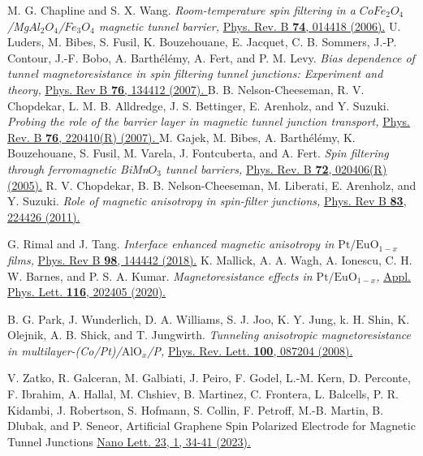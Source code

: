 \documentclass[10pt,pr,twocolumn,showpacs,amssymb,floatfix,superscriptaddress]{revtex4-1}
\begin{document}
\begin{thebibliography}{999}
 M. G. Chapline and S. X. Wang. 
\textit{Room-temperature spin filtering in a $Co$$Fe_2$$O_4$/Mg${Al}_{2}$$O_4$/$Fe_3$$O_4$ magnetic tunnel barrier,}
\href{https://doi.org/10.1103/PhysRevB.74.014418}{Phys. Rev. B {\bf 74}, 014418 (2006).}
U. Luders, M. Bibes, S. Fusil, K. Bouzehouane, E. Jacquet, C. B. Sommers, J.-P. Contour, J.-F. Bobo, A. Barth\'el\'emy, A. Fert, and P. M. Levy.
\textit{Bias dependence of tunnel magnetoresistance in spin filtering tunnel junctions: Experiment and theory,}
\href{https://doi.org/10.1103/PhysRevB.76.134412}{Phys. Rev B {\bf 76}, 134412 (2007). }
B. B. Nelson-Cheeseman, R. V. Chopdekar, L. M. B. Alldredge, J. S. Bettinger, E. Arenholz, and Y. Suzuki. 
\textit{Probing the role of the barrier layer in magnetic tunnel junction transport,}
\href{https://doi.org/10.1103/PhysRevB.76.220410}{Phys. Rev. B {\bf 76}, 220410(R) (2007). }
M. Gajek, M. Bibes, A. Barth\'el\'emy, K. Bouzehouane, S. Fusil, M. Varela, J. Fontcuberta, and A. Fert.  
\textit{Spin filtering through ferromagnetic BiMn$O_3$ tunnel barriers,}
\href{https://doi.org/10.1103/PhysRevB.72.020406}{Phys. Rev. B {\bf 72}, 020406(R) (2005).}
R. V. Chopdekar, B. B. Nelson-Cheeseman, M. Liberati, E. Arenholz, and Y. Suzuki. 
\textit{Role of magnetic anisotropy in spin-filter junctions,}
\href{https://doi.org/10.1103/PhysRevB.83.224426}{Phys. Rev B {\bf 83}, 224426 (2011).}

 G. Rimal and J. Tang.
\textit{Interface enhanced magnetic anisotropy in  $\text{Pt}/\text{EuO}_{1-x}$ films,}
\href{https://doi.org/10.1103/PhysRevB.98.144442}{Phys. Rev B {\bf 98}, 144442 (2018).}
K. Mallick, A. A. Wagh, A. Ionescu, C. H. W. Barnes, and P. S. A. Kumar.
\textit{Magnetoresistance effects in $\text{Pt}/\text{EuO}_{1-x}$,}
\href{https://doi.org/10.1063/5.0004049}{Appl. Phys. Lett. {\bf 116}, 202405 (2020).}

 B. G. Park, J. Wunderlich, D. A. Williams, S. J. Joo, K. Y. Jung, k. H. Shin, K. Olejnik, A. B. Shick, and T. Jungwirth.
\textit{Tunneling anisotropic magnetoresistance in multilayer-(Co/Pt)/$\text{AlO}_{x}$/P,}
\href{https://doi.org/10.1103/PhysRevLett.100.087204}{Phys. Rev. Lett. {\bf 100}, 087204 (2008).}


V. Zatko, R. Galceran, M. Galbiati, J. Peiro, F. Godel, L.-M. Kern, D. Perconte, F. Ibrahim, A. Hallal, M. Chshiev, B. Martinez, C. Frontera, L. Balcells, P. R. Kidambi, J. Robertson, S. Hofmann, S. Collin, F. Petroff, M.-B. Martin, B. Dlubak, and P. Seneor, 
Artificial Graphene Spin Polarized Electrode for Magnetic Tunnel Junctions
\href{https://pubs.acs.org/doi/full/10.1021/acs.nanolett.2c03113}{Nano Lett. 23, 1, 34-41 (2023).}





\end{thebibliography}
\end{document}
